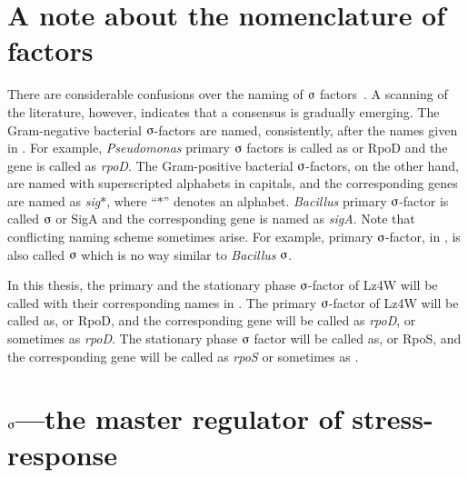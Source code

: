 \section{A note about the nomenclature of \s{} factors}

There are considerable confusions over the naming of $\sigmaup$
factors~\citep{Lonetto1996}. A scanning of the literature,
however, indicates that a consensus is gradually emerging. The
Gram-negative bacterial $\sigmaup$-factors are named,
consistently, after the names given in . For example,
\emph{Pseudomonas} primary $\sigmaup$ factors is called as
\s{} or RpoD and the gene is called as \emph{rpoD}. The
Gram-positive bacterial $\sigmaup$-factors, on the other hand, are
named with superscripted alphabets in capitals, and the
corresponding genes are named as \emph{sig}$\ast$, where
``$\ast$'' denotes an alphabet. \emph{Bacillus} primary
$\sigmaup$-factor is called $\sigmaup$ or SigA and the
corresponding gene is named as \emph{sigA}. Note that conflicting
naming scheme sometimes arise. For example, primary
$\sigmaup$-factor, \siga{} in , is also called
$\sigmaup$ which is no way similar to \emph{Bacillus}
$\sigmaup$.

In this thesis, the primary and the stationary phase
$\sigmaup$-factor of Lz4W will be called with their corresponding
names in . The primary $\sigmaup$-factor of Lz4W will be
called as, \s{} or RpoD, and the corresponding gene will be
called as \emph{rpoD}, or sometimes as \emph{rpoD}. The
stationary phase $\sigmaup$ factor will be called as, \sigs{} or
RpoS, and the corresponding gene will be called as \emph{rpoS} or
sometimes as \lzsig{}.

\section{$\sigmaup$---the master regulator of stress-response}


